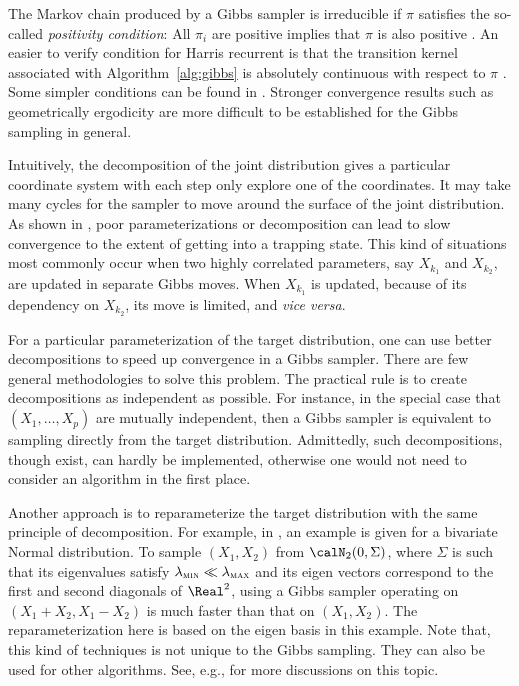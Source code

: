 

The Markov chain produced by a Gibbs sampler is irreducible if $\pi$ satisfies
the so-called \emph{positivity condition}: All $\pi_i$ are positive implies
that $\pi$ is also positive \cite[][Theorem~10.8]{Robert:2004tn}. An easier to
verify condition for Harris recurrent is that the transition kernel associated
with Algorithm~\ref{alg:gibbs} is absolutely continuous with respect to $\pi$
\cite{Tierney:1994uk}. Some simpler conditions can be found in
\cite{Hobert:1997vx}. Stronger convergence results such as geometrically
ergodicity are more difficult to be established for the Gibbs sampling in
general.

Intuitively, the decomposition of the joint distribution gives a particular
coordinate system with each step only explore one of the coordinates. It may
take many cycles for the sampler to move around the surface of the joint
distribution. As shown in \cite[][note~9.7.1]{Robert:2004tn}, poor
parameterizations or decomposition can lead to slow convergence to the extent
of getting into a trapping state. This kind of situations most commonly occur
when two highly correlated parameters, say $X_{k_1}$ and $X_{k_2}$, are
updated in separate Gibbs moves. When $X_{k_1}$ is updated, because of its
dependency on $X_{k_2}$, its move is limited, and \emph{vice versa}.

For a particular parameterization of the target distribution, one can use
better decompositions to speed up convergence in a Gibbs sampler. There are
few general methodologies to solve this problem. The practical rule is to
create decompositions as independent as possible. For instance, in the special
case that $(X_1,\dots,X_p)$ are mutually independent, then a Gibbs sampler is
equivalent to sampling directly from the target distribution. Admittedly, such
decompositions, though exist, can hardly be implemented, otherwise one would
not need to consider an \mcmc algorithm in the first place.

Another approach is to reparameterize the target distribution with the same
principle of decomposition. For example, in
\cite[][sec.~10.4.1]{Robert:2004tn}, an example is given for a bivariate
Normal distribution. To sample $(X_1,X_2)$ from $\calN_2(0, \Sigma)$, where
$\Sigma$ is such that its eigenvalues satisfy $\lambda_{\text{\textsc{min}}}
\ll \lambda_{\text{\textsc{max}}}$  and its eigen vectors correspond to the
first and second diagonals of $\Real^2$, using a Gibbs sampler operating on
$(X_1 + X_2, X_1 - X_2)$ is much faster than that on $(X_1,X_2)$. The
reparameterization here is based on the eigen basis in this example. Note
that, this kind of techniques is not unique to the Gibbs sampling. They can
also be used for other \mcmc algorithms. See, e.g.,
\cite{Hills:1993vb,Gilks:1996vx} for more discussions on this topic.

